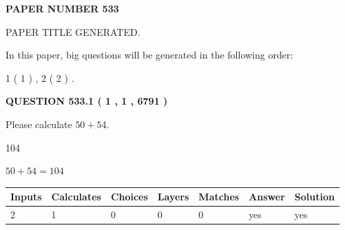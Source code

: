 \documentclass[12pt]{article}
\begin{document}
   
 {\textbf{ \Large{ PAPER NUMBER  533  }}}
   
   
\vspace{0.2in}
   
   
   
   
   
   
   
   
 \vspace{0.2in}
 
 
 
 
   
   
 PAPER TITLE GENERATED.
   
   
   
\vspace{0.2in}
   
In this paper, big questions will be generated in the following order: 
   
   
   1 ( 1 )
 ,
   2 ( 2 )
 .
  
\vspace{0.2in}
  
{\textbf{\Large{QUESTION
533.1 
 ( 1 , 1 , 6791 )
}}}
  
  
 
Please calculate $ %
50 +  %
54 $.
 
 
 
\noindent{}
 
 

104
 
 
\noindent{}
 
 

 
 
 
\noindent{}
 
 

$ %
50 +  %
54=   %
104$
 
 
\noindent{}
 
 

 
   
   
   
   
\noindent\begin{tabular}{|l|l|l|l|l|l|l|}
 \hline
Inputs & Calculates & Choices & Layers & Matches & Answer & Solution \\ \hline
 2  & 
 1  & 
 0
  & 
 0  & 
 0  & 
  yes & 
  yes 
  \\ \hline
 \end{tabular}
   
\end{document}
